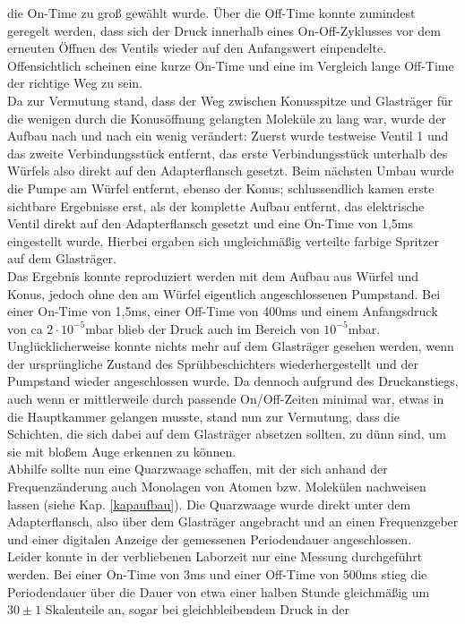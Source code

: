 die On-Time zu groß gewählt wurde. Über die Off-Time konnte zumindest geregelt werden, dass sich der
Druck innerhalb eines On-Off-Zyklusses vor dem erneuten Öffnen des Ventils wieder auf den
Anfangswert einpendelte. Offensichtlich scheinen eine kurze On-Time und eine im Vergleich lange
Off-Time der richtige Weg zu sein.\\
Da zur Vermutung stand, dass der Weg zwischen Konusspitze und Glasträger für die wenigen durch die
Konusöffnung gelangten Moleküle zu lang war, wurde der Aufbau nach und nach ein wenig verändert:
Zuerst wurde testweise Ventil 1 und das zweite Verbindungsstück entfernt, das erste Verbindungsstück
unterhalb des Würfels also direkt auf den Adapterflansch gesetzt. Beim nächsten Umbau wurde die
Pumpe am Würfel entfernt, ebenso der Konus; schlussendlich kamen erste sichtbare Ergebnisse erst,
als der komplette Aufbau entfernt, das elektrische Ventil direkt auf den
Adapterflansch gesetzt und eine On-Time von 1,5ms eingestellt wurde. Hierbei ergaben sich
ungleichmäßig verteilte farbige Spritzer auf dem Glasträger.\\
Das Ergebnis konnte reproduziert werden mit dem Aufbau aus Würfel und Konus, jedoch ohne den am
Würfel eigentlich angeschlossenen Pumpstand. Bei einer On-Time von 1,5ms, einer Off-Time von
400ms und einem Anfangsdruck von ca $2\cdot10^{-5}$mbar blieb der Druck auch im Bereich von
$10^{-5}$mbar.\\
Unglücklicherweise konnte nichts mehr auf dem Glasträger gesehen werden, wenn der ursprüngliche
Zustand des Sprühbeschichters wiederhergestellt und der Pumpstand wieder angeschlossen wurde. Da
dennoch aufgrund des Druckanstiegs, auch wenn er mittlerweile durch passende On/Off-Zeiten minimal
war, etwas in die Hauptkammer gelangen musste, stand nun zur Vermutung, dass die Schichten, die
sich dabei auf dem Glasträger absetzen sollten, zu dünn sind, um sie mit bloßem Auge
erkennen zu können.\\
Abhilfe sollte nun eine Quarzwaage schaffen, mit der sich anhand der Frequenzänderung auch Monolagen
von Atomen bzw. Molekülen nachweisen lassen (siehe Kap. \ref{kapaufbau}). Die Quarzwaage wurde
direkt unter dem Adapterflansch, also über dem Glasträger angebracht und an einen Frequenzgeber und einer
digitalen Anzeige der gemessenen Periodendauer angeschlossen.\\
Leider konnte in der verbliebenen Laborzeit nur eine Messung durchgeführt werden. Bei einer
On-Time von 3ms und einer Off-Time von 500ms stieg die Periodendauer über die Dauer von etwa einer
halben Stunde gleichmäßig um $30\pm1$ Skalenteile an, sogar bei gleichbleibendem Druck in der
